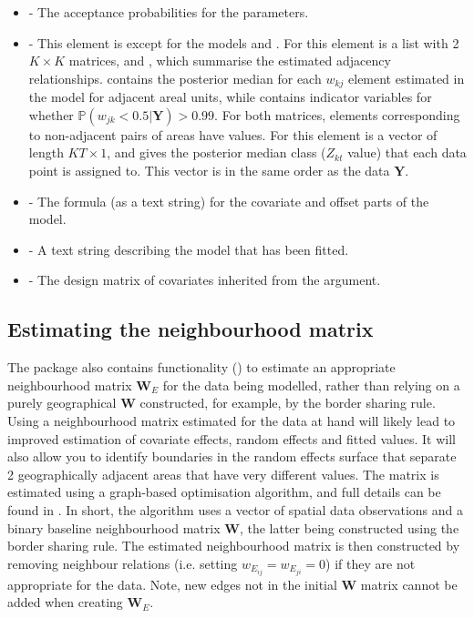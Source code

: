 \documentclass[article, nojss]{jss}
\begin{document}
\begin{itemize}
\item {} - The acceptance probabilities for the parameters.

\item {} - This element is  except for the models  and . For  this element is a list with 2 $K \times K$ matrices,  and , which summarise the estimated adjacency relationships.  contains the posterior median for each $w_{kj}$ element estimated in the model for adjacent areal units, while  contains indicator variables for whether $\mathbb{P}(w_{jk} < 0.5|\mathbf{Y})>0.99$. For both matrices, elements corresponding to non-adjacent pairs of areas have  values. For  this element is a vector of length $KT\times 1$, and gives the posterior median class ($Z_{kt}$ value) that each data point is assigned to. This vector is in the same order as the data $\mathbf{Y}$.
        
\item {} - The formula (as a text string) for the covariate and offset parts of the model.

\item {} - A text string describing the model that has been fitted.

\item {} - The design matrix of covariates inherited from the  argument.
\end{itemize}



\subsection{Estimating the neighbourhood matrix}
The package also contains functionality () to estimate an appropriate neighbourhood matrix $\mathbf{W}_E$ for the data being modelled, rather than relying on a purely geographical $\mathbf{W}$ constructed, for example, by the border sharing rule. Using a neighbourhood matrix estimated for the data at hand  will likely lead to improved estimation of covariate effects, random effects and fitted values. It will also allow you to identify boundaries in the random effects surface that separate 2 geographically adjacent areas that have very different values. The matrix is estimated using a graph-based optimisation algorithm, and full details can be found in \cite{lee2020improved}. In short, the algorithm uses a vector of spatial data observations and a  binary baseline neighbourhood matrix $\mathbf{W}$, the latter being constructed using the border sharing rule. The estimated neighbourhood matrix is then constructed by removing neighbour relations (i.e. setting $w_{E_{ij}}= w_{E_{ji}} = 0$) if they are not appropriate for the data. Note, new edges not in the initial $\mathbf{W}$ matrix cannot be added when creating $\mathbf{W}_E$.
\end{document}
